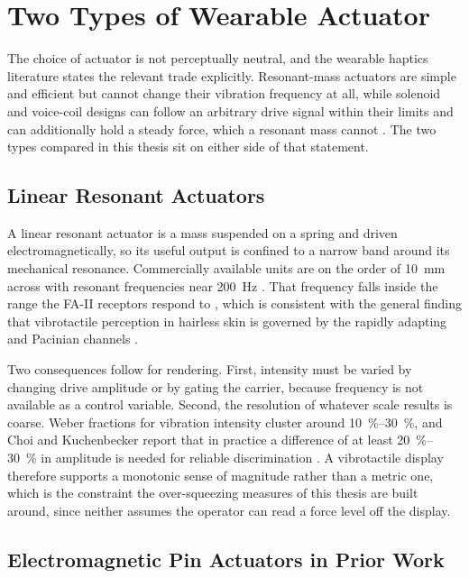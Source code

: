 \documentclass[12pt, a4paper, twoside, openright]{report}
\begin{document}
\section{Two Types of Wearable Actuator}
\label{sec:lit-actuators}

The choice of actuator is not perceptually neutral, and the wearable haptics
literature states the relevant trade explicitly. Resonant-mass actuators are
simple and efficient but cannot change their vibration frequency at all, while
solenoid and voice-coil designs can follow an arbitrary drive signal within
their limits and can additionally hold a steady force, which a resonant mass
cannot \cite{pacchierotti2017}. The two types compared in this thesis sit on
either side of that statement.

\subsection{Linear Resonant Actuators}
\label{subsec:lit-lra}

A linear resonant actuator is a mass suspended on a spring and driven
electromagnetically, so its useful output is confined to a narrow band around
its mechanical resonance. Commercially available units are on the order of
\SI{10}{\milli\metre} across with resonant frequencies near \SI{200}{\hertz}
\cite{choi2013}. That frequency falls inside the range the FA-II receptors
respond to \cite{johansson2009}, which is consistent with the general finding
that vibrotactile perception in hairless skin is governed by the rapidly
adapting and Pacinian channels \cite{choi2013}.

Two consequences follow for rendering. First, intensity must be varied by
changing drive amplitude or by gating the carrier, because frequency is not
available as a control variable. Second, the resolution of whatever scale
results is coarse. Weber fractions for vibration intensity cluster around
\SIrange{10}{30}{\percent}, and Choi and Kuchenbecker report that in practice a
difference of at least \SIrange{20}{30}{\percent} in amplitude is needed for
reliable discrimination \cite{choi2013}. A vibrotactile display therefore
supports a monotonic sense of magnitude rather than a metric one, which is the
constraint the over-squeezing measures of this thesis are built around, since
neither assumes the operator can read a force level off the display.

\subsection{Electromagnetic Pin Actuators in Prior Work}
\label{subsec:lit-em}
\end{document}
